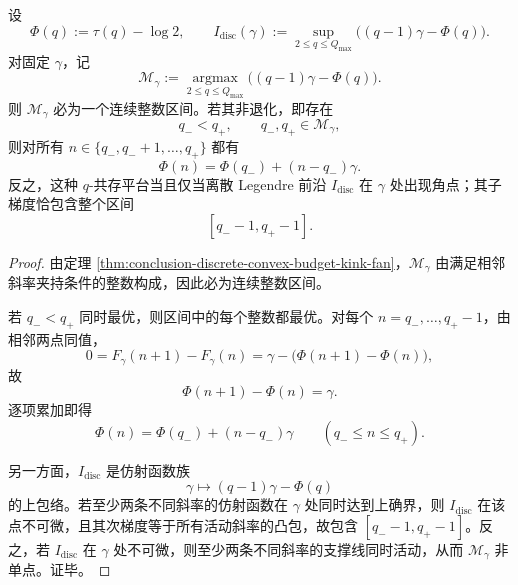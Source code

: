 \begin{theorem}[\(q\)-共存平台与离散速率前沿角点]\label{thm:conclusion-q-coexistence-platform-discrete-rate-corner}
设
\[
\Phi(q):=\tau(q)-\log 2,
\qquad
I_{\mathrm{disc}}(\gamma):=\sup_{2\le q\le Q_{\max}}\bigl((q-1)\gamma-\Phi(q)\bigr).
\]
对固定 \(\gamma\)，记
\[
\mathcal M_\gamma:=\operatorname*{argmax}_{2\le q\le Q_{\max}}\bigl((q-1)\gamma-\Phi(q)\bigr).
\]
则 \(\mathcal M_\gamma\) 必为一个连续整数区间。若其非退化，即存在
\[
q_-<q_+,\qquad q_-,q_+\in \mathcal M_\gamma,
\]
则对所有 \(n\in\{q_-,q_-+1,\dots,q_+\}\) 都有
\[
\Phi(n)=\Phi(q_-)+(n-q_-)\gamma.
\]
反之，这种 \(q\)-共存平台当且仅当离散 Legendre 前沿 \(I_{\mathrm{disc}}\) 在 \(\gamma\) 处出现角点；其子梯度恰包含整个区间
\[
[q_--1,q_+-1].
\]
\end{theorem}
\begin{proof}
由定理 \ref{thm:conclusion-discrete-convex-budget-kink-fan}，\(\mathcal M_\gamma\) 由满足相邻斜率夹持条件的整数构成，因此必为连续整数区间。

若 \(q_-<q_+\) 同时最优，则区间中的每个整数都最优。对每个 \(n=q_-,\dots,q_+-1\)，由相邻两点同值，
\[
0=F_\gamma(n+1)-F_\gamma(n)=\gamma-\bigl(\Phi(n+1)-\Phi(n)\bigr),
\]
故
\[
\Phi(n+1)-\Phi(n)=\gamma.
\]
逐项累加即得
\[
\Phi(n)=\Phi(q_-)+(n-q_-)\gamma
\qquad
(q_-\le n\le q_+).
\]

另一方面，\(I_{\mathrm{disc}}\) 是仿射函数族
\[
\gamma\longmapsto (q-1)\gamma-\Phi(q)
\]
的上包络。若至少两条不同斜率的仿射函数在 \(\gamma\) 处同时达到上确界，则 \(I_{\mathrm{disc}}\) 在该点不可微，且其次梯度等于所有活动斜率的凸包，故包含 \([q_--1,q_+-1]\)。反之，若 \(I_{\mathrm{disc}}\) 在 \(\gamma\) 处不可微，则至少两条不同斜率的支撑线同时活动，从而 \(\mathcal M_\gamma\) 非单点。证毕。
\end{proof}

